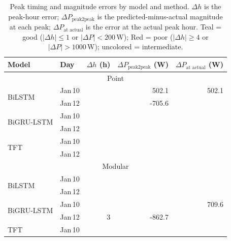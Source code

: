 \documentclass[final,10pt,1p,authoryear]{elsarticle}
\theoremstyle{definition}
\begin{document}
\begin{table}[!htbp]
\centering
\caption{Peak timing and magnitude errors by model and method. $\Delta h$ is the peak-hour error; $\Delta P_{\text{peak2peak}}$ is the predicted-minus-actual magnitude at each peak; $\Delta P_{\text{at actual}}$ is the error at the actual peak hour. \colorbox{goodcell}{Teal} = good ($|\Delta h|\leq 1$ or $|\Delta P|<200$\,W); \colorbox{badcell}{Red} = poor ($|\Delta h|\geq 4$ or $|\Delta P|>1000$\,W); uncolored = intermediate.}
\label{tab:peak_deltas_grouped}
\begin{tabular}{l l r r r}
\toprule
Model & Day & $\Delta h$ (h) & $\Delta P_{\text{peak2peak}}$ (W) & $\Delta P_{\text{at actual}}$ (W) \\
\midrule
\multicolumn{5}{c}{{Point}} \\
\midrule
\multirow{2}{*}{BiLSTM}     & Jan\,10 & \cellcolor{goodcell}{0} & 502.1 & 502.1 \\
                            & Jan\,12 & \cellcolor{badcell}{6} & -705.6 & \cellcolor{badcell}{-2555.7} \\
\cmidrule{1-5}
\multirow{2}{*}{BiGRU-LSTM} & Jan\,10 & \cellcolor{goodcell}{0} & \cellcolor{goodcell}{13.4} & \cellcolor{goodcell}{13.4} \\
                            & Jan\,12 & \cellcolor{badcell}{5} & \cellcolor{badcell}{-1111.4} & \cellcolor{badcell}{-3423.6} \\
\cmidrule{1-5}
\multirow{2}{*}{TFT}        & Jan\,10 & \cellcolor{goodcell}{0} & \cellcolor{goodcell}{-151.3} & \cellcolor{goodcell}{-151.3} \\
                            & Jan\,12 & \cellcolor{badcell}{5} & \cellcolor{goodcell}{-153.5} & \cellcolor{badcell}{-1267.2} \\
\midrule
\multicolumn{5}{c}{{Modular}} \\
\midrule
\multirow{2}{*}{BiLSTM}     & Jan\,10 & \cellcolor{goodcell}{-1} & \cellcolor{badcell}{2002.0} & \cellcolor{badcell}{1320.9} \\
                            & Jan\,12 & \cellcolor{badcell}{4} & \cellcolor{goodcell}{140.2} & \cellcolor{badcell}{-1280.0} \\
\cmidrule{1-5}
\multirow{2}{*}{BiGRU-LSTM} & Jan\,10 & \cellcolor{badcell}{-4} & \cellcolor{badcell}{1065.1} & 709.6 \\
                            & Jan\,12 & 3 & -862.7 & \cellcolor{badcell}{-2661.1} \\
\cmidrule{1-5}
\multirow{2}{*}{TFT}        & Jan\,10 & \cellcolor{goodcell}{0} & \cellcolor{goodcell}{120.1} & \cellcolor{goodcell}{120.1} \\

\end{tabular}
\end{table}
\end{document}
